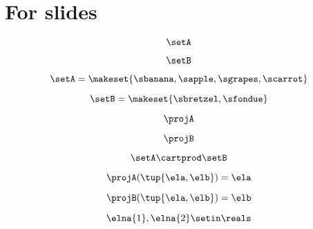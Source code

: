 
\section[For slides]{For slides}

\begin{forslides}

    \begin{equation}
        \label{eq:combination-000}
        \setA
    \end{equation}
       
     \begin{equation}
        \label{eq:combination-001}
        \setB
    \end{equation}
    
     \begin{equation}
        \label{eq:combination-002}
        \setA = \makeset{\sbanana, \sapple, \sgrapes, \scarrot}
    \end{equation}
    
    \begin{equation}
        \label{eq:combination-003}
        \setB = \makeset{ \sbretzel, \sfondue }
    \end{equation}
    
     \begin{equation}
        \label{eq:combination-004}
       \projA
    \end{equation}
    
     \begin{equation}
        \label{eq:combination-005}
        \projB
    \end{equation}
    
    \begin{equation}
        \label{eq:combination-006}
        \setA \cartprod \setB
    \end{equation}
    
     \begin{equation}
        \label{eq:combination-007}
       \projA(\tup{\ela,\elb}) =  \ela
    \end{equation}
    
     \begin{equation}
        \label{eq:combination-008}
        \projB(\tup{\ela,\elb}) = \elb
    \end{equation}
    
    \begin{equation}
        \label{eq:combination-009}
        \elna{1},\elna{2}\setin \reals
    \end{equation}
    

\end{forslides}
